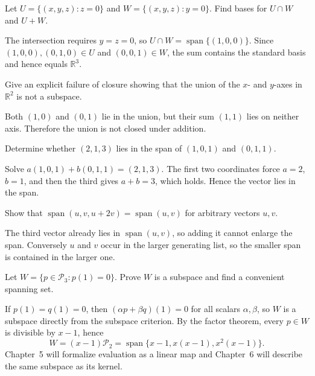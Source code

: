 \begin{problem}\label{prob:i02-problem-01}
Let $U=\{(x,y,z):z=0\}$ and $W=\{(x,y,z):y=0\}$. Find bases for $U\cap W$ and $U+W$.
\end{problem}
\begin{solution}
The intersection requires $y=z=0$, so $U\cap W=\operatorname{span}\{(1,0,0)\}$. Since $(1,0,0),(0,1,0)\in U$ and $(0,0,1)\in W$, the sum contains the standard basis and hence equals $\mathbb R^3$.
\end{solution}

\begin{problem}\label{prob:i02-problem-02}
Give an explicit failure of closure showing that the union of the $x$- and $y$-axes in $\mathbb R^2$ is not a subspace.
\end{problem}
\begin{solution}
Both $(1,0)$ and $(0,1)$ lie in the union, but their sum $(1,1)$ lies on neither axis. Therefore the union is not closed under addition.
\end{solution}

\begin{problem}\label{prob:i02-problem-03}
Determine whether $(2,1,3)$ lies in the span of $(1,0,1)$ and $(0,1,1)$.
\end{problem}
\begin{solution}
Solve $a(1,0,1)+b(0,1,1)=(2,1,3)$. The first two coordinates force $a=2$, $b=1$, and then the third gives $a+b=3$, which holds. Hence the vector lies in the span.
\end{solution}

\begin{problem}\label{prob:i02-problem-04}
Show that $\operatorname{span}(u,v,u+2v)=\operatorname{span}(u,v)$ for arbitrary vectors $u,v$.
\end{problem}
\begin{solution}
The third vector already lies in $\operatorname{span}(u,v)$, so adding it cannot enlarge the span. Conversely $u$ and $v$ occur in the larger generating list, so the smaller span is contained in the larger one.
\end{solution}

\begin{problem}\label{prob:i02-problem-05}
Let $W=\{p\in\mathcal P_3:p(1)=0\}$. Prove $W$ is a subspace and find a convenient spanning set.
\end{problem}
\begin{solution}
If $p(1)=q(1)=0$, then $(\alpha p+\beta q)(1)=0$ for all scalars $\alpha,\beta$, so $W$ is a subspace directly from the subspace criterion. By the factor theorem, every $p\in W$ is divisible by $x-1$, hence
\[
W=(x-1)\mathcal P_2=\operatorname{span}\{x-1,x(x-1),x^2(x-1)\}.
\]
Chapter~5 will formalize evaluation as a linear map and Chapter~6 will describe the same subspace as its kernel.
\end{solution}

